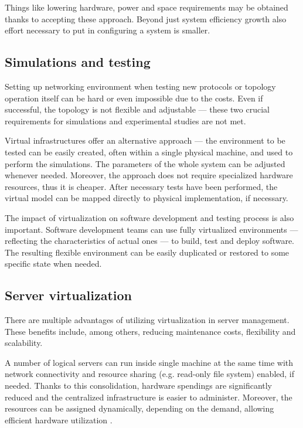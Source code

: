 \documentclass[11pt,openany]{book}
\begin{document}
      Things like lowering hardware, power and space requirements may be obtained thanks to accepting these approach.
      Beyond just system efficiency growth also effort necessary to put in configuring a system is smaller. 


      \subsection{Simulations and testing}

        Setting up networking environment when testing new protocols or topology operation itself can be hard or even
        impossible due to the costs. Even if successful, the topology is not flexible and adjustable --- these two
        crucial requirements for simulations and experimental studies are not met.

        Virtual infrastructures offer an alternative approach --- the environment to be tested can be easily created,
        often within a single physical machine, and used to perform the simulations. The parameters of the whole system
        can be adjusted whenever needed. Moreover, the approach does not require specialized hardware resources, thus it
        is cheaper. After necessary tests have been performed, the virtual model can be mapped directly to physical
        implementation, if necessary.

        The impact of virtualization on software development and testing process is also important. Software development
        teams can use fully virtualized environments --- reflecting the characteristics of actual ones --- to build,
        test and deploy software. The resulting flexible environment can be easily duplicated or restored to some
        specific state when needed.


      \subsection{Server virtualization}
        
        There are multiple advantages of utilizing virtualization in server management. These benefits include, among
        others, reducing maintenance costs, flexibility and scalability.

        A number of logical servers can run inside single machine at the same time with network connectivity and
        resource sharing (e.g. read-only file system) enabled, if needed. Thanks to this consolidation, hardware
        spendings are significantly reduced and the centralized infrastructure is easier to administer. Moreover, the
        resources can be assigned dynamically, depending on the demand, allowing efficient hardware utilization
        \cite{server-consolidation}.
\end{document}
